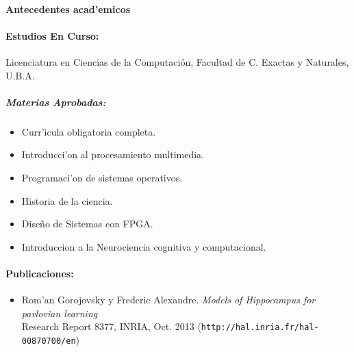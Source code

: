\paragraph{Antecedentes acad'emicos}

\paragraph{Estudios En Curso:}
Licenciatura en Ciencias de la Computaci\'{o}n, Facultad de C. Exactas y Naturales, U.B.A.
\subparagraph{Materias Aprobadas:}
\begin{itemize} 
	\item Curr'icula obligatoria completa.
	\item Introducci'on al procesamiento multimedia.
	\item Programaci'on de sistemas operativos.
	\item Historia de la ciencia.
	\item Diseño de Sistemas con FPGA.
	\item Introduccion a la Neurociencia cognitiva y computacional.
\end{itemize}

\paragraph{Publicaciones:}
\begin{itemize}
	\item Rom'an Gorojovsky y Frederic Alexandre. \emph{Models of Hippocampus for pavlovian learning}\\
		Research Report 8377, INRIA, Oct. 2013 (\texttt{http://hal.inria.fr/hal-00870700/en})
\end{itemize}

